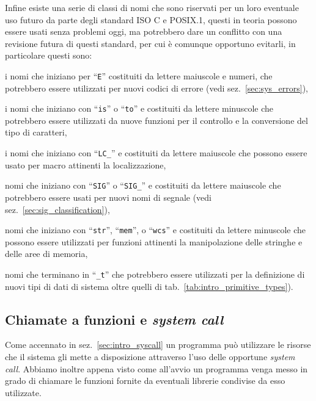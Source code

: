 Infine esiste una serie di classi di nomi che sono riservati per un loro
eventuale uso futuro da parte degli standard ISO C e POSIX.1, questi in teoria
possono essere usati senza problemi oggi, ma potrebbero dare un conflitto con
una revisione futura di questi standard, per cui è comunque opportuno
evitarli, in particolare questi sono:
\begin{itemize*}
\item i nomi che iniziano per ``\texttt{E}'' costituiti da lettere maiuscole e
  numeri, che potrebbero essere utilizzati per nuovi codici di errore (vedi
  sez.~\ref{sec:sys_errors}),
\item i nomi che iniziano con ``\texttt{is}'' o ``\texttt{to}'' e costituiti
  da lettere minuscole che potrebbero essere utilizzati da nuove funzioni per
  il controllo e la conversione del tipo di caratteri,
\item i nomi che iniziano con ``\texttt{LC\_}'' e costituiti
  da lettere maiuscole che possono essere usato per macro attinenti la
  localizzazione,%
\item nomi che iniziano con ``\texttt{SIG}'' o ``\texttt{SIG\_}'' e costituiti
  da lettere maiuscole che potrebbero essere usati per nuovi nomi di segnale
  (vedi sez.~\ref{sec:sig_classification}),
\item nomi che iniziano con ``\texttt{str}'', ``\texttt{mem}'', o
  ``\texttt{wcs}'' e costituiti da lettere minuscole che possono essere
  utilizzati per funzioni attinenti la manipolazione delle stringhe e delle
  aree di memoria,
\item nomi che terminano in ``\texttt{\_t}'' che potrebbero essere utilizzati
  per la definizione di nuovi tipi di dati di sistema oltre quelli di
  tab.~\ref{tab:intro_primitive_types}).
\end{itemize*}


\subsection{Chiamate a funzioni e \textit{system call}}
\label{sec:proc_syscall}

Come accennato in sez.~\ref{sec:intro_syscall} un programma può utilizzare le
risorse che il sistema gli mette a disposizione attraverso l'uso delle
opportune \textit{system call}. Abbiamo inoltre appena visto come all'avvio un
programma venga messo in grado di chiamare le funzioni fornite da eventuali
librerie condivise da esso utilizzate. 

